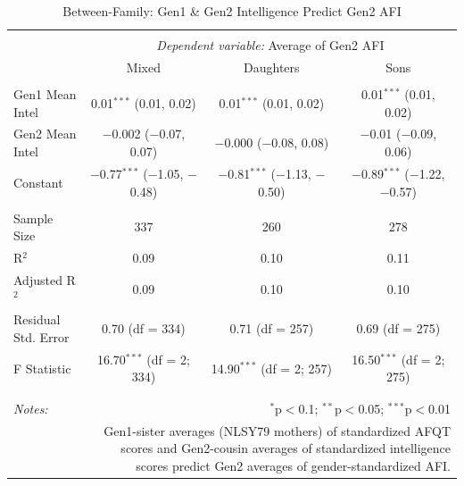 \documentclass[a4paper,man,apacite,natbib,12pt,longtable]{apa6}\usepackage[]{graphicx}\usepackage[]{color}
\begin{document}
\begin{landscape}
\begin{longtable}{@{\extracolsep{5pt}}lccc} 
\caption{Between-Family: Gen1 \& Gen2 Intelligence Predict Gen2 AFI}\label{table_Mean_Joint_Intelligence_Mean_Child_AFI_9}
\\[-1.8ex]\hline 
\hline \\[-3.8ex] 
& \multicolumn{3}{c}{\textit{Dependent variable:} Average of Gen2 AFI} \\ 
\cline{2-4}
 & Mixed & Daughters & Sons \\ 
\hline \\[-1.8ex] 
 Gen1 Mean Intel & 0.01$^{***}$ (0.01, 0.02) & 0.01$^{***}$ (0.01, 0.02) & 0.01$^{***}$ (0.01, 0.02) \\ 
  Gen2 Mean Intel & $-$0.002 ($-$0.07, 0.07) & $-$0.000 ($-$0.08, 0.08) & $-$0.01 ($-$0.09, 0.06) \\ 
  Constant & $-$0.77$^{***}$ ($-$1.05, $-$0.48) & $-$0.81$^{***}$ ($-$1.13, $-$0.50) & $-$0.89$^{***}$ ($-$1.22, $-$0.57) \\ 
 \hline \\[-1.8ex] 
Sample Size & 337 & 260 & 278 \\ 
R$^{2}$ & 0.09 & 0.10 & 0.11 \\ 
Adjusted R$^{2}$ & 0.09 & 0.10 & 0.10 \\ 
Residual Std. Error & 0.70 (df = 334) & 0.71 (df = 257) & 0.69 (df = 275) \\ 
F Statistic & 16.70$^{***}$ (df = 2; 334) & 14.90$^{***}$ (df = 2; 257) & 16.50$^{***}$ (df = 2; 275) \\ 
\hline 
\hline \\[-1.8ex] \\[-7ex]
\textit{Notes:}  & \multicolumn{3}{r}{$^{*}$p$<$0.1; $^{**}$p$<$0.05; $^{***}$p$<$0.01} \\[2ex]
& \multicolumn{3}{r}{\parbox{.6\linewidth}{\footnotesize Gen1-sister averages (NLSY79 mothers) of standardized AFQT scores and Gen2-cousin averages of standardized intelligence scores predict Gen2 averages of gender-standardized AFI.}} \\ 
\end{longtable}



\end{landscape}
\end{document}
